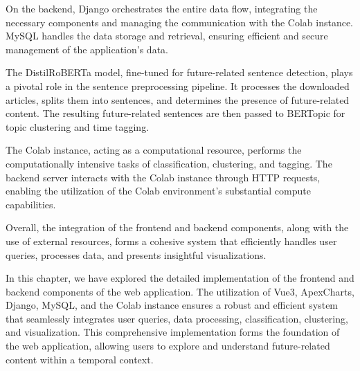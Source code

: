 \documentclass[a4paper,12pt]{report} %
\begin{document}
On the backend, Django orchestrates the entire data flow, integrating the necessary components and managing the communication with the Colab instance. MySQL handles the data storage and retrieval, ensuring efficient and secure management of the application's data.

The DistilRoBERTa model, fine-tuned for future-related sentence detection, plays a pivotal role in the sentence preprocessing pipeline. It processes the downloaded articles, splits them into sentences, and determines the presence of future-related content. The resulting future-related sentences are then passed to BERTopic for topic clustering and time tagging.

The Colab instance, acting as a computational resource, performs the computationally intensive tasks of classification, clustering, and tagging. The backend server interacts with the Colab instance through HTTP requests, enabling the utilization of the Colab environment's substantial compute capabilities.

Overall, the integration of the frontend and backend components, along with the use of external resources, forms a cohesive system that efficiently handles user queries, processes data, and presents insightful visualizations.

In this chapter, we have explored the detailed implementation of the frontend and backend components of the web application. The utilization of Vue3, ApexCharts, Django, MySQL, and the Colab instance ensures a robust and efficient system that seamlessly integrates user queries, data processing, classification, clustering, and visualization. This comprehensive implementation forms the foundation of the web application, allowing users to explore and understand future-related content within a temporal context.



\end{document}
